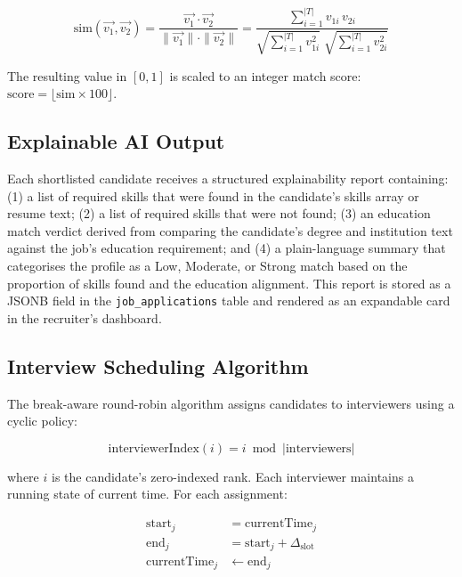 \documentclass[12pt,a4paper]{report}
\begin{document}
\begin{equation}
    \text{sim}(\vec{v_1}, \vec{v_2})
    = \frac{\vec{v_1} \cdot \vec{v_2}}{\|\vec{v_1}\| \cdot \|\vec{v_2}\|}
    = \frac{\displaystyle\sum_{i=1}^{|T|} v_{1i}\,v_{2i}}
           {\displaystyle\sqrt{\sum_{i=1}^{|T|} v_{1i}^2}\;\sqrt{\sum_{i=1}^{|T|} v_{2i}^2}}
\end{equation}

The resulting value in $[0,1]$ is scaled to an integer match score: $\text{score} = \lfloor \text{sim} \times 100 \rfloor$.

\subsection{Explainable AI Output}

Each shortlisted candidate receives a structured explainability report containing: (1) a list of required skills that were found in the candidate's skills array or resume text; (2) a list of required skills that were not found; (3) an education match verdict derived from comparing the candidate's degree and institution text against the job's education requirement; and (4) a plain-language summary that categorises the profile as a Low, Moderate, or Strong match based on the proportion of skills found and the education alignment. This report is stored as a JSONB field in the \texttt{job\_applications} table and rendered as an expandable card in the recruiter's dashboard.

\subsection{Interview Scheduling Algorithm}

The break-aware round-robin algorithm assigns candidates to interviewers using a cyclic policy:

\begin{equation}
    \text{interviewerIndex}(i) = i \bmod |\text{interviewers}|
\end{equation}

where $i$ is the candidate's zero-indexed rank. Each interviewer maintains a running state of current time. For each assignment:

\begin{align}
    \text{start}_j &= \text{currentTime}_j \\
    \text{end}_j   &= \text{start}_j + \Delta_{\text{slot}} \\
    \text{currentTime}_j &\leftarrow \text{end}_j
\end{align}
\end{document}
